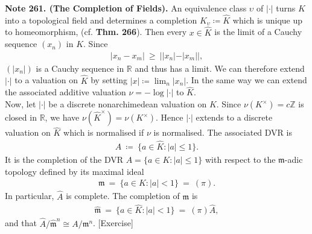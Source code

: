\documentclass[12pt,a4paper,footinclude=true,headinclude=true]{scrbook} %
\newenvironment{nt}[2][Note]
    { \begin{mdframed}[backgroundcolor=gray!20] \textbf{#1 #2.} }
    {  \end{mdframed}}
\begin{document}
\begin{nt}{261. (The Completion of Fields)}
    \newline An equivalence class $\upsilon$ of $|\cdot|$ turns $K$ into a topological field and determines a completion $K_\upsilon\coloneqq\widehat{K}$ which is unique up to homeomorphism, (cf. \textbf{Thm. 266}). Then every $x\in\widehat{K}$ is the limit of a Cauchy sequence $(x_n)$ in $K$. Since
    \begin{align*}
        |x_n-x_m|\ \geq\ ||x_n|-|x_m||,
    \end{align*}
    $(|x_n|)$ is a Cauchy sequence in $\mathbb{R}$ and thus has a limit. We can therefore extend $|\cdot|$ to a valuation on $\widehat{K}$ by setting $|x|\coloneqq\lim_n|x_n|$. In the same way we can extend the associated additive valuation $\nu=-\log|\cdot|$ to $\widehat{K}$.\\
    Now, let $|\cdot|$ be a discrete nonarchimedean valuation on $K$. Since $\nu(K^\times)=c\mathbb{Z}$ is closed in $\mathbb{R}$, we have $\nu(\widehat{K}^\times)=\nu(K^\times)$. Hence $|\cdot|$ extends to a  discrete valuation on $\widehat{K}$ which is normalised if $\nu$ is normalised. The associated DVR is 
    \begin{align*}
        \widehat{A}\ \coloneqq\ \{a\in\widehat{K}:|a|\leq1\}.
    \end{align*}
    It is the completion of the DVR $A=\{a\in K:|a|\leq1\}$ with respect to the $\mathfrak{m}$-adic topology defined by its maximal ideal 
    \begin{align*}
        \mathfrak{m}\ =\ \{a\in K:|a|<1\}\ =\ (\pi).
    \end{align*}
    In particular, $\widehat{A}$ is complete. The completion of $\mathfrak{m}$ is 
    \begin{align*}
        \widehat{\mathfrak{m}}\ =\ \{a\in\widehat{K}:|a|<1\}\ =\ (\pi)\widehat{A},
    \end{align*}
    and that $\widehat{A}/\widehat{\mathfrak{m}}^n\cong A/\mathfrak{m}^n$. [Exercise]
\end{nt}
\end{document}
